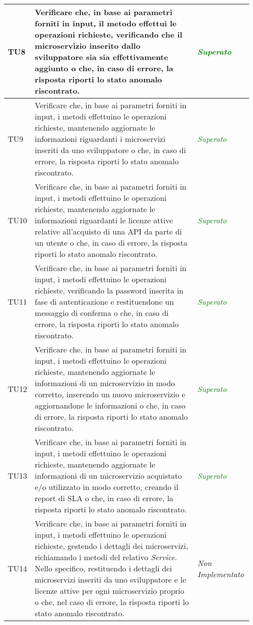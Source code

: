 \begin{longtable}{|>{\centering\arraybackslash}p{1.5cm}|>{\centering\arraybackslash}p{8cm} | >{\centering\arraybackslash}p{3.8cm}|}
		\hypertarget{TU8}{TU8} & Verificare che, in base ai parametri forniti in input,	il metodo effettui le operazioni richieste, verificando che il microservizio inserito dallo sviluppatore sia sia effettivamente aggiunto o che, in caso di errore, la risposta riporti lo stato anomalo riscontrato. & \textcolor{Green}{\textit{Superato}}\\ \hline
		\hypertarget{TU9}{TU9} & Verificare che, in base ai parametri forniti in input, i metodi effettuino le operazioni richieste, mantenendo aggiornate le informazioni riguardanti i microservizi inseriti da uno sviluppatore o che, in caso di errore, la risposta riporti lo stato anomalo riscontrato. & \textcolor{Green}{\textit{Superato}}\\ \hline
		\hypertarget{TU10}{TU10} & Verificare che, in base ai parametri forniti in input, i metodi effettuino le operazioni richieste, mantenendo aggiornate le informazioni riguardanti le licenze attive relative all'acquisto di una API da parte di un utente o che, in caso di errore, la risposta riporti lo stato anomalo riscontrato. & \textcolor{Green}{\textit{Superato}}\\ \hline
		\hypertarget{TU11}{TU11} & Verificare che, in base ai parametri forniti in input, i metodi effettuino le operazioni richieste, verificando la password inserita in fase di autenticazione e restituendone un messaggio di conferma	o che, in caso di errore, la risposta riporti lo stato anomalo riscontrato. & \textcolor{Green}{\textit{Superato}}\\ \hline
		\hypertarget{TU12}{TU12} & Verificare che, in base ai parametri forniti in input, i metodi effettuino le operazioni richieste, mantenendo aggiornate le informazioni di un microservizio in modo corretto, inserendo un nuovo microservizio e aggiornandone le informazioni o che, in caso di errore, la risposta riporti lo stato anomalo riscontrato. & \textcolor{Green}{\textit{Superato}}\\ \hline		
		\hypertarget{TU13}{TU13} & Verificare che, in base ai parametri forniti in input, i metodi effettuino le operazioni richieste, mantenendo aggiornate le informazioni di un microservizio acquistato e/o utilizzato in modo corretto, creando il report di SLA o che, in caso di errore, la risposta riporti lo stato anomalo riscontrato. & \textcolor{Green}{\textit{Superato}}\\ \hline
		\hypertarget{TU14}{TU14} & Verificare che, in base ai parametri forniti in input, i metodi effettuino le operazioni richieste, gestendo i dettagli dei microservizi, richiamando i metodi del relativo \textit{Service}. Nello specifico, restituendo i dettagli dei microservizi inseriti da uno sviluppatore e le licenze attive per ogni microservizio proprio o che, nel caso di errore, la risposta riporti lo stato anomalo riscontrato. & \textit{Non Implementato}\\ \hline

\end{longtable}
